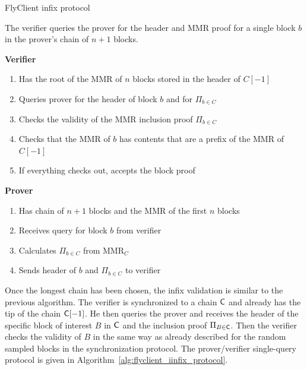 	\begin{algorithm}[h!]
		\caption{\label{alg:flyclient_iinfix_protocol}FlyClient infix protocol~\cite{flyclient}}
		\begin{flushleft}
		The verifier queries the prover for the header and MMR proof for a single block $b$ in the prover's chain of $n+1$ blocks.
		\begin{center}
			\textbf{Verifier}
		\end{center}
		\begin{enumerate}
			\item Has the root of the MMR of $n$ blocks stored in the header of $C[-1]$
			\item Queries prover for the header of block $b$ and for $\Pi_{b \in C}$
			\item Checks the validity of the MMR inclusion proof $\Pi_{b \in C}$
			\item Checks that the MMR of $b$ has contents that are a prefix of the MMR of $C[-1]$
			\item If everything checks out, accepts the block proof
		\end{enumerate}
		\begin{center}
			\textbf{Prover}
		\end{center}
		\begin{enumerate}
			\item Has chain of $n+1$ blocks and the MMR of the first $n$ blocks
			\item Receives query for block $b$ from verifier
			\item Calculates $\Pi_{b \in C}$ from MMR$_C$
			\item Sends header of $b$ and $\Pi_{b \in C}$ to verifier
		\end{enumerate}
		\end{flushleft}
	\end{algorithm}

	Once the longest chain has been chosen, the infix validation is similar to the previous algorithm.
	The verifier is synchronized to a chain $\mathsf{C}$ and already has the tip of the chain $\mathsf{C}[-1]$. He then queries the prover and receives the header of the specific block of interest $B$ in $\mathsf{C}$ and the inclusion proof $\Pi_{B \in \mathsf{C}}$. Then the verifier checks the validity of $B$ in the same way as already described for the random sampled blocks in the synchronization protocol.
	The prover/verifier single-query protocol is given in Algorithm~\ref{alg:flyclient_iinfix_protocol}.


